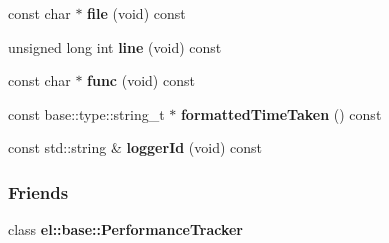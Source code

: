 \begin{DoxyCompactItemize}
\item 
\hypertarget{a00067_a51512448de4eb220514f193a2fc14849}{}const char $\ast$ {\bfseries file} (void) const \label{a00067_a51512448de4eb220514f193a2fc14849}

\item 
\hypertarget{a00067_a82529dd8d0c92bf377ec269cb4f69a45}{}unsigned long int {\bfseries line} (void) const \label{a00067_a82529dd8d0c92bf377ec269cb4f69a45}

\item 
\hypertarget{a00067_a12fe4fe91e83cbff7d5bb4736176ec30}{}const char $\ast$ {\bfseries func} (void) const \label{a00067_a12fe4fe91e83cbff7d5bb4736176ec30}

\item 
\hypertarget{a00067_a44a4c82d400155bd147eb455025c88fc}{}const base\+::type\+::string\+\_\+t $\ast$ {\bfseries formatted\+Time\+Taken} () const \label{a00067_a44a4c82d400155bd147eb455025c88fc}

\item 
\hypertarget{a00067_ae8ad846d155762ae7cab3fb67760f5a1}{}const std\+::string \& {\bfseries logger\+Id} (void) const \label{a00067_ae8ad846d155762ae7cab3fb67760f5a1}

\end{DoxyCompactItemize}
\subsubsection*{Friends}
\begin{DoxyCompactItemize}
\item 
\hypertarget{a00067_a6a4d7851e1984800be3c230f06a79528}{}class {\bfseries el\+::base\+::\+Performance\+Tracker}\label{a00067_a6a4d7851e1984800be3c230f06a79528}

\end{DoxyCompactItemize}
